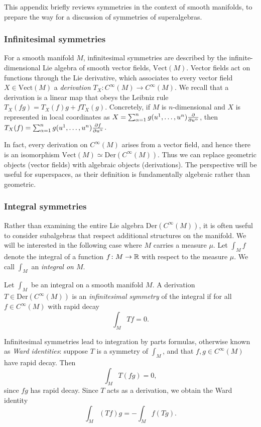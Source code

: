 \documentclass[11pt,a4paper]{article}
\begin{document}
This appendix briefly reviews symmetries in the context of smooth
manifolds, to prepare the way for a discussion of symmetries of superalgebras.

\subsubsection{Infinitesimal symmetries}

For a smooth manifold $M$, 
infinitesimal symmetries are described by the infinite-dimensional Lie algebra of
smooth vector fields, $\mathrm{Vect}(M)$.  Vector fields act on
functions through the Lie derivative, which 
associates to every vector field $X \in \mathrm{Vect}(M)$ a \emph{derivation}
$T_X\colon C^{\infty}(M)\rightarrow C^{\infty}(M)$.
We recall that a derivation is
a linear map that obeys the Leibniz rule $T_X(fg) = T_X(f)g + fT_X(g)$. Concretely,
if $M$ is $n$-dimensional and $X$ is represented in local coordinates as
$X = \sum_{\alpha=1}^{n}g(u^1,\dots,u^n)\frac{\partial }{\partial u^\alpha}$, then
$T_X(f) = \sum_{\alpha=1}^{n}g(u^1,\dots,u^n)\frac{\partial f}{\partial u^\alpha}$.

In fact, every derivation on $C^{\infty}(M)$ arises from a vector
field, and hence there is an isomorphism
$\mathrm{Vect}(M) \simeq \mathrm{Der}(C^{\infty}(M))$.
Thus we can replace geometric objects (vector fields) with algebraic objects
(derivations).
The perspective will be useful for
superspaces, as their definition is fundamentally algebraic rather than geometric.



\subsubsection{Integral symmetries}
Rather than examining the entire Lie algebra
$\mathrm{Der}(C^{\infty}(M))$, it is often useful to consider
subalgebras that respect additional structures on the manifold. We
will be interested in the following case where $M$ carries a measure
$\mu$.  Let $\int_{M}f$ denote the integral of a function
$f\colon M\to \mathbb{R}$ with respect to the measure $\mu$. We call
$\int_{M}$ an \emph{integral on $M$}.
%
%
\begin{definition}\label{def:int-sym}
  Let $\int_M$ be an integral on a smooth manifold $M$.  A derivation
  $T\in \mathrm{Der}(C^\infty(M))$ is an \emph{infinitesimal symmetry} of the
  integral if for all $f \in C^\infty(M)$ with rapid decay
  \begin{equation}
    \label{e:T-symmetry}
    \int_M T f = 0.
  \end{equation}
\end{definition}
Infinitesimal symmetries lead to integration by parts formulas,
otherwise known as \emph{Ward identities}: 
suppose $T$ is a symmetry of $\int_M$, and that $f,g\in C^{\infty}(M)$ 
have rapid decay. Then 
\begin{equation}
\int_M T(fg) = 0,
\end{equation}
since $fg$ has rapid decay. Since $T$ acts as a derivation, we obtain
the Ward identity
\begin{equation}
\int_M (Tf) g = -\int_M f (Tg).
\end{equation}
\end{document}
